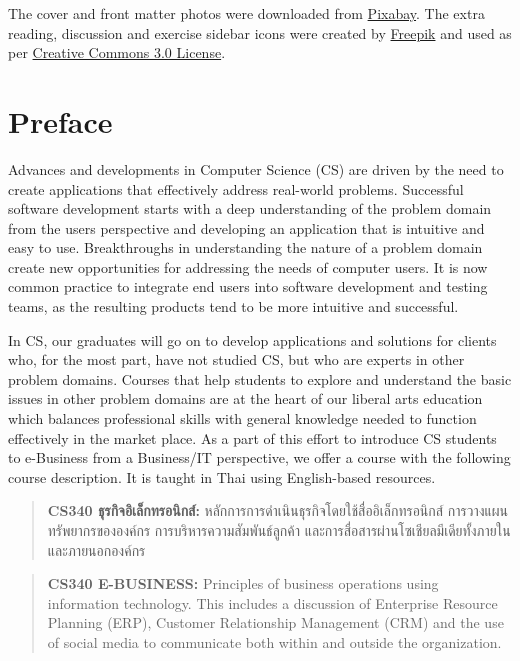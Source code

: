 \documentclass[]{book}
\begin{document}
The cover and front matter photos were downloaded from \href{https://pixabay.com/images/search/singapore}{Pixabay}.
The extra reading, discussion and exercise sidebar icons were created by \href{https://www.freepik.com}{Freepik} and used as per \href{https://creativecommons.org/licenses/by/3.0}{Creative Commons 3.0 License}.

\hypertarget{preface}{%
\chapter*{Preface}\label{preface}}

Advances and developments in Computer Science (CS) are driven by the need to create applications that effectively address real-world problems. Successful software development starts with a deep understanding of the problem domain from the users perspective and developing an application that is intuitive and easy to use. Breakthroughs in understanding the nature of a problem domain create new opportunities for addressing the needs of computer users. It is now common practice to integrate end users into software development and testing teams, as the resulting products tend to be more intuitive and successful.

In CS, our graduates will go on to develop applications and solutions for clients who, for the most part, have not studied CS, but who are experts in other problem domains. Courses that help students to explore and understand the basic issues in other problem domains are at the heart of our liberal arts education which balances professional skills with general knowledge needed to function effectively in the market place.
As a part of this effort to introduce CS students to e-Business from a Business/IT perspective, we offer a course with the following course description. It is taught in Thai using English-based resources.

\begin{quote}
\textbf{CS340 ธุรกิจอิเล็กทรอนิกส์:} หลักการการดำเนินธุรกิจโดยใช้สื่ออิเล็กทรอนิกส์ การวางแผนทรัพยากรขององค์กร การบริหารความสัมพันธ์ลูกค้า และการสื่อสารผ่านโซเชียลมีเดียทั้งภายในและภายนอกองค์กร
\end{quote}

\begin{quote}
\textbf{CS340 E-BUSINESS:} Principles of business operations using information technology. This includes a discussion of Enterprise Resource Planning (ERP), Customer Relationship Management (CRM) and the use of social media to communicate both within and outside the organization.
\end{quote}
\end{document}
